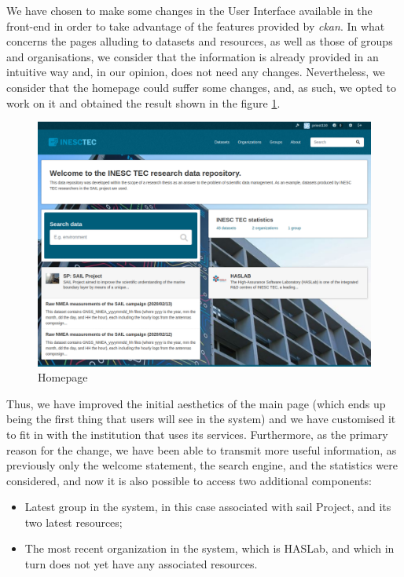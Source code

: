 We have chosen to make some changes in the User Interface available in the front-end in order to take advantage of the features provided by \textit{\gls{ckan}}. In what concerns the pages alluding to datasets and resources, as well as those of groups and organisations, we consider that the information is already provided in an intuitive way and, in our opinion, does not need any changes. Nevertheless, we consider that the homepage could suffer some changes, and, as such, we opted to work on it and obtained the result shown in the figure \ref{tab:homepage}.

\begin{figure}[!h]
    \centering
    \includegraphics[width=1\textwidth]{img/solution/UI.png}
    \caption{\label{tab:homepage} Homepage}
\end{figure}

Thus, we have improved the initial aesthetics of the main page (which ends up being the first thing that users will see in the system) and we have customised it to fit in with the institution that uses its services. Furthermore, as the primary reason for the change, we have been able to transmit more useful information, as previously only the welcome statement, the search engine, and the statistics were considered, and now it is also possible to access two additional components:

\begin{itemize}
    \item Latest group in the system, in this case associated with \gls{sail} Project, and its two latest resources;
    \item The most recent organization in the system, which is HASLab, and which in turn does not yet have any associated resources.
\end{itemize}